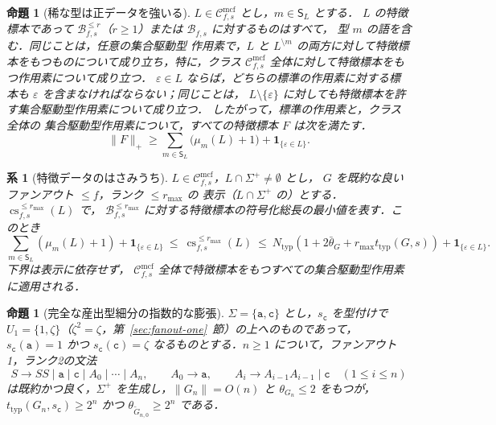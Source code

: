 \documentclass[11pt,a4paper]{ltjsarticle}
\numberwithin{equation}{section}
\theoremstyle{plain}
\newtheorem{proposition}[theorem]{命題}
\newtheorem{corollary}[theorem]{系}
\theoremstyle{definition}
\theoremstyle{remark}
\newcommand{\Cmcf}[2]{\mathcal{C}^{\mathrm{mcf}}_{#1,#2}}
\newcommand{\eps}{\varepsilon}
\theoremstyle{plain}
\begin{document}
\begin{proposition}[稀な型は正データを強いる]
\label{prop:rare-type}
$L\in\Cmcf{f}{s}$ とし，$m\in \mathsf S_L$ とする．
$L$ の特徴標本であって
$\mathcal B^{\le r}_{f,s}$（$r\ge1$）または $\mathcal B_{f,s}$ に対するものはすべて，
型 $m$ の語を含む．同じことは，任意の集合駆動型
作用素で，$L$ と
$L^{\setminus m}$ の両方に対して特徴標本をもつものについて成り立ち，特に，クラス
$\Cmcf{f}{s}$ 全体に対して特徴標本をもつ作用素について成り立つ．
$\eps\in L$ ならば，どちらの標準の作用素に対する標本も
$\eps$ を含まなければならない；同じことは，
$L\setminus\{\eps\}$ に対しても特徴標本を許す集合駆動型作用素について成り立つ．
したがって，標準の作用素と，クラス全体の
集合駆動型作用素について，すべての特徴標本 $F$ は次を満たす．
\[
 \|F\|_+\ge
 \sum_{m\in \mathsf S_L}\bigl(\mu_m(L)+1\bigr)
 +\mathbf 1_{\{\eps\in L\}}.
\]
\end{proposition}

\begin{corollary}[特徴データのはさみうち]
\label{cor:typed-sandwich}
$L\in\Cmcf{f}{s}$，$L\cap\Sigma^+\ne\emptyset$ とし，
$G$ を既約な良いファンアウト $\le f$，ランク $\le r_{\max}$ の
表示（$L\cap\Sigma^+$ の）とする．
$\operatorname{cs}^{\le r_{\max}}_{f,s}(L)$ で，
$\mathcal B^{\le r_{\max}}_{f,s}$ に対する特徴標本の符号化総長の最小値を表す．このとき
\[
 \sum_{m\in \mathsf S_L}(\mu_m(L)+1)+\mathbf 1_{\{\eps\in L\}}
 \ \le\ \operatorname{cs}^{\le r_{\max}}_{f,s}(L)
 \ \le\ N_{\mathrm{typ}}
  (1+2\bar\theta_G+r_{\max}t_{\mathrm{typ}}(G,s))
 +\mathbf 1_{\{\eps\in L\}}.
\]
下界は表示に依存せず，
$\Cmcf{f}{s}$ 全体で特徴標本をもつすべての集合駆動型作用素に適用される．
\end{corollary}

\begin{proposition}[完全な産出型細分の指数的な膨張]
\label{prop:typed-thickness-exponential}
$\Sigma=\{\mathtt a,\mathtt c\}$ とし，$s_{\mathtt c}$ を型付けで
$U_1=\{1,\zeta\}$（$\zeta^2=\zeta$，第~\ref{sec:fanout-one}~節）の上へのものであって，$s_{\mathtt c}(\mathtt a)=1$ かつ
$s_{\mathtt c}(\mathtt c)=\zeta$ なるものとする．$n\ge1$ について，ファンアウト1，ランク2の文法
\[
 S\to SS\mid\mathtt a\mid\mathtt c\mid A_0\mid\cdots\mid A_n,\qquad
 A_0\to\mathtt a,\qquad
 A_i\to A_{i-1}A_{i-1}\mid\mathtt c\quad(1\le i\le n)
\]
は既約かつ良く，$\Sigma^+$ を生成し，$\|G_n\|=O(n)$ と
$\theta_{G_n}\le2$ をもつが，$t_{\mathrm{typ}}(G_n,s_{\mathtt c})\ge2^n$ かつ
$\theta_{\widetilde G_{n,0}}\ge2^n$ である．
\end{proposition}
\end{document}
